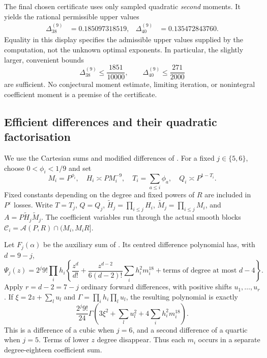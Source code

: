 \documentclass[11pt,letterpaper]{article}
\numberwithin{equation}{section}
\begin{document}
The final chosen certificate uses only sampled quadratic \emph{second}
moments.  It yields the rational permissible upper values
\begin{align}
 \Delta_{38}^{(9)}&=0.185097318519, &
 \Delta_{40}^{(9)}&=0.135472843760. \label{eq:chosen-pair}
\end{align}
Equality in this display specifies the admissible upper values supplied by
the computation, not the unknown optimal exponents.  In particular, the
slightly larger, convenient bounds
\begin{equation}
 \Delta_{38}^{(9)}\le\frac{1851}{10000},\qquad
 \Delta_{40}^{(9)}\le\frac{271}{2000}
 \label{eq:coarse-pair}
\end{equation}
are sufficient.  No conjectural moment estimate, limiting iteration, or
nonintegral coefficient moment is a premise of the certificate.

\subsection{Efficient differences and their quadratic factorisation}

We use the Cartesian sums and modified differences of \cite[Section 2]{VW00}.
For a fixed $j\in\{5,6\}$, choose $0<\phi_i<1/9$ and set
\[
 M_i=P^{\phi_i},\quad H_i\asymp PM_i^{-9},\quad
 T_i=\sum_{a\le i}\phi_a,\quad Q_i\asymp P^{1-T_i}.
\]
Fixed constants depending on the degree and fixed powers of $R$ are included
in $P^\varepsilon$ losses.  Write $T=T_j$, $Q=Q_j$,
$\widetilde H_j=\prod_{i\le j}H_i$,
$\widetilde M_j=\prod_{i\le j}M_i$, and $A=P\widetilde H_j\widetilde M_j$.
The coefficient variables run through the actual smooth blocks
$\mathcal C_i=\mathcal A(P,R)\cap(M_i,M_iR]$.

Let $F_j(\alpha)$ be the auxiliary sum of \cite[(2.1)]{VW00}.  Its
centred difference polynomial has, with $d=9-j$,
\[
 \Psi_j(z)=2^j9!\prod_i h_i
 \left\{\frac{z^d}{d!}+\frac{z^{d-2}}{6(d-2)!}
                       \sum_i h_i^2m_i^{18}
             +\text{terms of degree at most }d-4\right\}.
\]
Apply $r=d-2=7-j$ ordinary forward differences, with positive shifts
$u_1,\ldots,u_r$.  If $\xi=2z+\sum_lu_l$ and
$\Gamma=\prod_i h_i\prod_lu_l$, the resulting polynomial is exactly
\begin{equation}
 \frac{2^j9!}{24}\Gamma
       \left(3\xi^2+\sum_lu_l^2+4\sum_i h_i^2m_i^{18}\right).
 \label{eq:quadratic-factorisation}
\end{equation}
This is a difference of a cubic when $j=6$, and a second difference of a
quartic when $j=5$.  Terms of lower $z$ degree disappear.  Thus each
$m_i$ occurs in a separate degree-eighteen coefficient sum.
\end{document}
